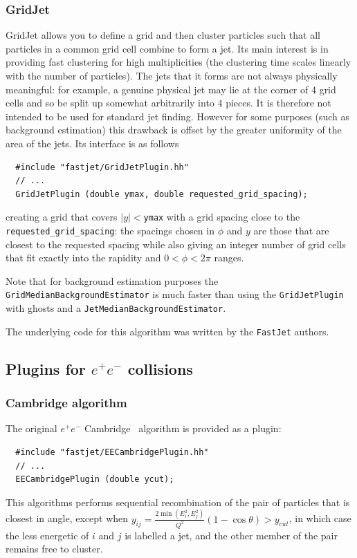 \documentclass[12pt,a4]{article}
\newcommand{\fastjet}{\texttt{FastJet}\xspace}
\newcommand{\ttt}[1]{{\small\texttt{#1}}}
\newcommand{\ee}{e^+e^-}
\begin{document}
\subsubsection{GridJet}
%
GridJet allows you to define a grid and then cluster particles such
that all particles in a common grid cell combine to form a jet.
%
Its main interest is in providing fast clustering for high
multiplicities (the clustering time scales linearly with the number of
particles).
%
The jets that it forms are not always physically meaningful: for
example, a genuine physical jet may lie at the corner of 4 grid cells
and so be split up somewhat arbitrarily into 4 pieces.
%
It is therefore not intended to be used for standard jet finding.
%
However for some purposes (such as background estimation) this
drawback is offset by the greater uniformity of the area of the jets.
%
Its interface is as follows
\begin{lstlisting}
  #include "fastjet/GridJetPlugin.hh"
  // ...
  GridJetPlugin (double ymax, double requested_grid_spacing);
\end{lstlisting}
creating a grid that covers $|y|<$\ttt{ymax} with a grid spacing close
to the \ttt{requested\_grid\_spacing}: the spacings chosen in $\phi$
and $y$ are those that are closest to the requested spacing while also
giving an integer number of grid cells that fit exactly into the
rapidity and $0<\phi <2\pi$ ranges.

Note that for background estimation purposes the
\ttt{GridMedianBackgroundEstimator} is much faster than using the
\ttt{GridJetPlugin} with ghosts and a
\ttt{JetMedianBackgroundEstimator}.

The underlying code for this algorithm was written by the \fastjet
authors.


\subsection{Plugins for $e^+e^-$ collisions}
\label{sec:other-ee-plugins}

\subsubsection{Cambridge algorithm}
\label{sec:ee-cam}
The original $\ee$ Cambridge~\cite{CamOrig} algorithm is provided as a plugin:
\begin{lstlisting}
  #include "fastjet/EECambridgePlugin.hh"
  // ...
  EECambridgePlugin (double ycut);
\end{lstlisting}
This algorithms performs sequential recombination of the pair of
particles that is closest in angle, except when $y_{ij} =
\frac{2\min(E_i^2,E_j^2)}{Q^2}(1-\cos\theta) > y_{cut}$, in which case
the less energetic of $i$ and $j$ is labelled a jet, and the other
member of the pair remains free to cluster.
\end{document}
